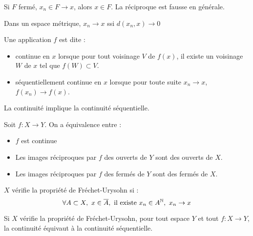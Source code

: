 \documentclass{cours}
\begin{document}
\begin{proposition}
    Si $F$ fermé, $x_{n} \in F \to x$, alors $x \in F$. La réciproque est fausse en générale.
\end{proposition}

\begin{theorem}
    Dans un espace métrique, $x_{n} \to x$ ssi $d(x_{n}, x) \to 0$
\end{theorem}

\begin{definition}
    Une application $f$ est dite :
    \begin{itemize}
        \item continue en $x$ lorsque pour tout voisinage $V$ de $f(x)$, il existe un voisinage $W$ de $x$ tel que $f(W) \subset V$.
        \item séquentiellement continue en $x$ lorsque pour toute suite $x_{n} \to x$, $f(x_{n}) \to f(x)$.
    \end{itemize}
\end{definition}

\begin{proposition}
    La continuité implique la continuité séquentielle.
\end{proposition}

\begin{proposition}
    Soit $f : X \rightarrow Y$. On a équivalence entre : 
    \begin{itemize}
        \item $f$ est continue
        \item Les images réciproques par $f$ des ouverts de $Y$ sont des ouverts de $X$.
        \item Les images réciproques par $f$ des fermés de $Y$ sont des fermés de $X$.
    \end{itemize}
\end{proposition}

\begin{definition}
    $X$ vérifie la propriété de Fréchet-Urysohn si : 
    \[\forall A \subset X,\ x \in \overline{A}, \text{ il existe } x_{n} \in A^{\mathbb{N}},\ x_{n} \to x\]    
\end{definition}

\begin{theorem}
    Si $X$ vérifie la propriété de Fréchet-Urysohn, pour tout espace $Y$ et tout $f : X \rightarrow Y$, la continuité équivaut à la continuité séquentielle.
\end{theorem}
\end{document}
